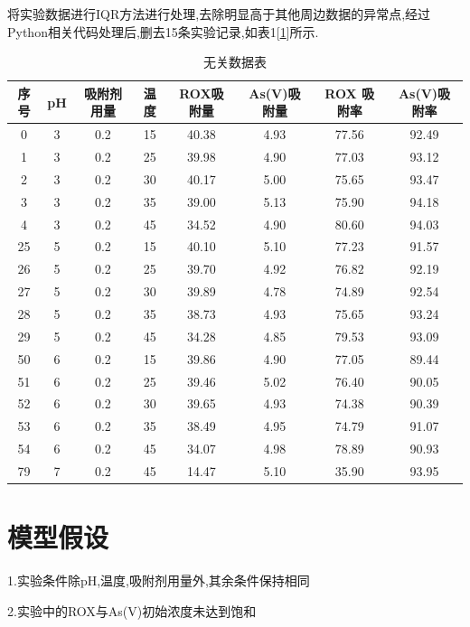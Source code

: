 \documentclass[AutoFakeBold]{ctexart}
\begin{document}
	将实验数据进行IQR方法进行处理,去除明显高于其他周边数据的异常点,经过Python相关代码处理后,删去15条实验记录,如表1[\ref{tab:data}]所示.
	\begin{table}[H]
		\centering
		\begin{tabular}{|c|c|c|c|c|c|c|c|}
			\hline
			序号 & pH & 吸附剂用量 &温度& ROX吸附量 & As(V)吸附量 & ROX 吸附率 & As(V)吸附率 \\
			\hline
			0  & 3 & 0.2 & 15 & 40.38 & 4.93 & 77.56 & 92.49 \\\hline
			1  & 3 & 0.2 & 25 & 39.98 & 4.90 & 77.03 & 93.12 \\\hline
			2  & 3 & 0.2 & 30 & 40.17 & 5.00 & 75.65 & 93.47 \\\hline
			3  & 3 & 0.2 & 35 & 39.00 & 5.13 & 75.90 & 94.18 \\\hline
			4  & 3 & 0.2 & 45 & 34.52 & 4.90 & 80.60 & 94.03 \\\hline
			25 & 5 & 0.2 & 15 & 40.10 & 5.10 & 77.23 & 91.57 \\\hline
			26 & 5 & 0.2 & 25 & 39.70 & 4.92 & 76.82 & 92.19 \\\hline
			27 & 5 & 0.2 & 30 & 39.89 & 4.78 & 74.89 & 92.54 \\\hline
			28 & 5 & 0.2 & 35 & 38.73 & 4.93 & 75.65 & 93.24 \\\hline
			29 & 5 & 0.2 & 45 & 34.28 & 4.85 & 79.53 & 93.09 \\\hline
			50 & 6 & 0.2 & 15 & 39.86 & 4.90 & 77.05 & 89.44 \\\hline
			51 & 6 & 0.2 & 25 & 39.46 & 5.02 & 76.40 & 90.05 \\\hline
			52 & 6 & 0.2 & 30 & 39.65 & 4.93 & 74.38 & 90.39 \\\hline
			53 & 6 & 0.2 & 35 & 38.49 & 4.95 & 74.79 & 91.07 \\\hline
			54 & 6 & 0.2 & 45 & 34.07 & 4.98 & 78.89 & 90.93 \\\hline
			79 & 7 & 0.2 & 45 & 14.47 & 5.10 & 35.90 & 93.95 \\
			\hline
		\end{tabular}
		\caption{无关数据表}
		\label{tab:data}
	\end{table}
	\section{模型假设}
	
		
		1.实验条件除pH,温度,吸附剂用量外,其余条件保持相同
		
		2.实验中的ROX与As(V)初始浓度未达到饱和
		
\end{document}
